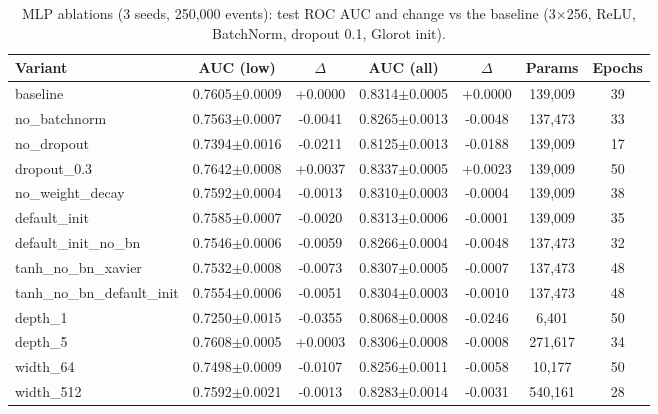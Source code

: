 \begin{table}[!t]
\centering
\caption{MLP ablations (3 seeds, 250,000 events): test ROC AUC and change vs the baseline (3$\times$256, ReLU, BatchNorm, dropout 0.1, Glorot init).}
\label{tab:ablations}
\footnotesize
\setlength{\tabcolsep}{3.5pt}
\begin{tabular}{lcccccc}
\toprule
Variant & AUC (low) & $\Delta$ & AUC (all) & $\Delta$ & Params & Epochs \\
\midrule
baseline & 0.7605$\pm$0.0009 & +0.0000 & 0.8314$\pm$0.0005 & +0.0000 & 139,009 & 39 \\
no\_batchnorm & 0.7563$\pm$0.0007 & -0.0041 & 0.8265$\pm$0.0013 & -0.0048 & 137,473 & 33 \\
no\_dropout & 0.7394$\pm$0.0016 & -0.0211 & 0.8125$\pm$0.0013 & -0.0188 & 139,009 & 17 \\
dropout\_0.3 & 0.7642$\pm$0.0008 & +0.0037 & 0.8337$\pm$0.0005 & +0.0023 & 139,009 & 50 \\
no\_weight\_decay & 0.7592$\pm$0.0004 & -0.0013 & 0.8310$\pm$0.0003 & -0.0004 & 139,009 & 38 \\
default\_init & 0.7585$\pm$0.0007 & -0.0020 & 0.8313$\pm$0.0006 & -0.0001 & 139,009 & 35 \\
default\_init\_no\_bn & 0.7546$\pm$0.0006 & -0.0059 & 0.8266$\pm$0.0004 & -0.0048 & 137,473 & 32 \\
tanh\_no\_bn\_xavier & 0.7532$\pm$0.0008 & -0.0073 & 0.8307$\pm$0.0005 & -0.0007 & 137,473 & 48 \\
tanh\_no\_bn\_default\_init & 0.7554$\pm$0.0006 & -0.0051 & 0.8304$\pm$0.0003 & -0.0010 & 137,473 & 48 \\
depth\_1 & 0.7250$\pm$0.0015 & -0.0355 & 0.8068$\pm$0.0008 & -0.0246 & 6,401 & 50 \\
depth\_5 & 0.7608$\pm$0.0005 & +0.0003 & 0.8306$\pm$0.0008 & -0.0008 & 271,617 & 34 \\
width\_64 & 0.7498$\pm$0.0009 & -0.0107 & 0.8256$\pm$0.0011 & -0.0058 & 10,177 & 50 \\
width\_512 & 0.7592$\pm$0.0021 & -0.0013 & 0.8283$\pm$0.0014 & -0.0031 & 540,161 & 28 \\
\bottomrule
\end{tabular}
\end{table}
